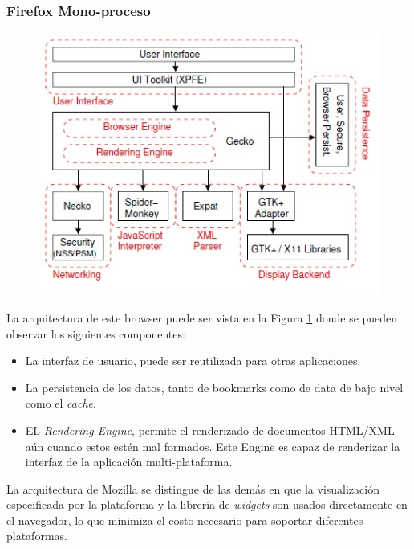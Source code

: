     \subsubsection{Firefox Mono-proceso}
        \begin{figure}[h!t]
    		\centering
        	\includegraphics[scale=0.8]{figures/archMoz.jpg}
            \label{fig:archM}
        \end{figure}
                
        La arquitectura de este browser puede ser vista en la Figura \ref{fig:archM} donde se pueden observar los siguientes componentes:
                \begin{itemize}
                    \item La interfaz de usuario, puede ser reutilizada para otras aplicaciones.
                    \item La persistencia de los datos, tanto de bookmarks como de data de bajo nivel como el \textit{cache}.
                    \item EL \textit{Rendering Engine}, permite el renderizado de documentos HTML/XML aún cuando estos estén mal formados. Este Engine es capaz de renderizar la interfaz de la aplicación multi-plataforma.
                \end{itemize}
        La arquitectura de Mozilla se distingue de las demás en que la visualización especificada por la plataforma y la librería de \textit{widgets} son usados directamente en el navegador, lo que minimiza el costo necesario para soportar diferentes plataformas.

